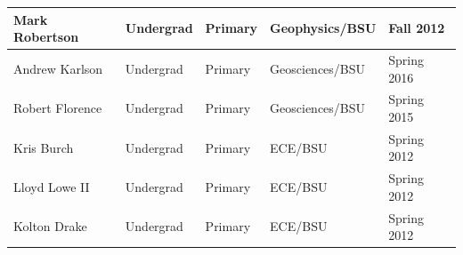 \documentclass[11pt]{article}
\begin{document}
\begin{table}[!htbp]
\begin{tabular}{|l|l|l|l|l|}
Mark Robertson & Undergrad & Primary & Geophysics/BSU & Fall 2012 \\ \hline
Andrew Karlson & Undergrad & Primary & Geosciences/BSU & Spring 2016 \\ \hline
Robert Florence & Undergrad & Primary & Geosciences/BSU & Spring 2015 \\ \hline
Kris Burch & Undergrad & Primary & ECE/BSU & Spring 2012 \\ \hline
Lloyd Lowe II & Undergrad & Primary & ECE/BSU & Spring 2012 \\ \hline
Kolton Drake & Undergrad & Primary & ECE/BSU & Spring 2012 \\ \hline
\end{tabular}
\end{table}

\pagebreak
\end{document}
